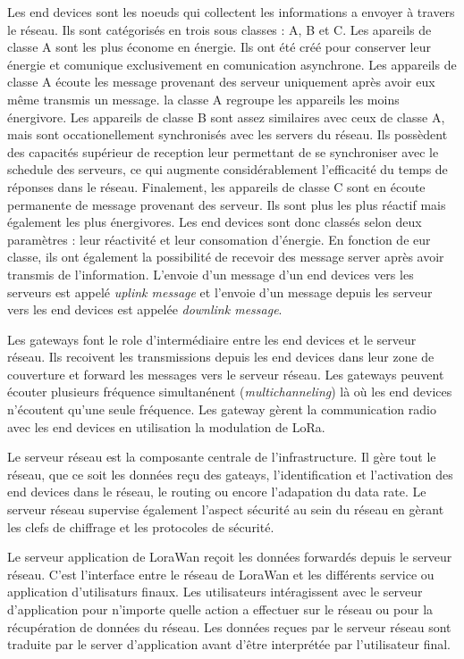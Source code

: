 Les end devices sont les noeuds qui collectent les informations a envoyer à travers le réseau. Ils sont catégorisés en trois sous classes : A, B et C. Les apareils de classe A sont les plus économe en énergie. Ils ont été créé pour conserver leur énergie et comunique exclusivement en comunication asynchrone. Les appareils de classe A écoute les message provenant des serveur uniquement après avoir eux même transmis un message. la classe A regroupe les appareils les moins énergivore. Les appareils de classe B sont assez similaires avec ceux de classe A, mais sont occationellement synchronisés avec les servers du réseau. Ils possèdent des capacités supérieur de reception leur permettant de se synchroniser avec le schedule des serveurs, ce qui augmente considérablement l'efficacité du temps de réponses dans le réseau. Finalement, les appareils de classe C sont en écoute permanente de message provenant des serveur. Ils sont plus les plus réactif mais également les plus énergivores. Les end devices sont donc classés selon deux paramètres : leur réactivité et leur consomation d'énergie. En fonction de eur classe, ils ont également la possibilité de recevoir des message server après avoir transmis de l'information. L'envoie d'un message d'un end devices vers les serveurs est appelé \textit{uplink message} et l'envoie d'un message depuis les serveur vers les end devices est appelée \textit{downlink message}.

Les gateways font le role d'intermédiaire entre les end devices et le serveur réseau. Ils recoivent les transmissions depuis les end devices dans leur zone de couverture
et forward les messages vers le serveur réseau. Les gateways peuvent écouter plusieurs fréquence simultanénent (\textit{multichanneling}) là où les end devices n'écoutent qu'une seule fréquence. Les gateway gèrent la communication radio avec les end devices en utilisation la modulation de LoRa.

Le serveur réseau est la composante centrale de l'infrastructure. Il gère tout le réseau, que ce soit les données reçu des gateays, l'identification et l'activation des end devices dans le réseau, le routing ou encore l'adapation du data rate. Le serveur réseau supervise également l'aspect sécurité au sein du réseau en gèrant les clefs de chiffrage et les protocoles de sécurité.

Le serveur application de LoraWan reçoit les données forwardés depuis le serveur réseau. C'est l'interface entre le réseau de LoraWan et les différents service ou application d'utilisaturs finaux. Les utilisateurs intéragissent avec le serveur d'application pour n'importe quelle action a effectuer sur le réseau ou pour la récupération de données du réseau. Les données reçues par le serveur réseau sont traduite par le server d'application avant d'être interprétée par l'utilisateur final.

